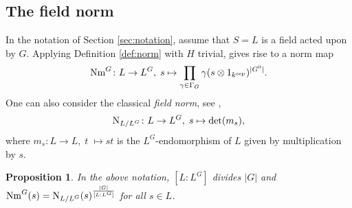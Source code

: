 \documentclass[12pt]{amsart}
\newtheorem{proposition}[theorem]{Proposition}
\theoremstyle{definition}
\begin{document}
\subsection{The field norm} \label{sec:fieldnorm}
In the notation of Section \ref{sec:notation}, assume that $S=L$ is a field acted upon by $G$. Applying Definition \ref{def:norm} with $H$ trivial, gives rise to a norm map 
\[
{\rm Nm}^G \colon L\rightarrow L^G,\;s\mapsto  \prod_{\gamma \in \Gamma_G}\gamma (s\otimes 1_{k^{\text{sep}}})^{|G^0|}.
\] 
One can also consider the classical {\em field norm}, see \cite[page 456]{MR3677125},
\begin{equation}\label{eq:normother2}
	{\rm N}_{L/L^G} \colon L\rightarrow L^G,\; s\mapsto {\rm det}(m_s),
\end{equation}
where $m_s \colon L\rightarrow L,\;t\;{\mapsto}st$ is the $L^G$-endomorphism of $L$ given by multiplication by $s$.

\begin{proposition}
	In the above notation, $[L{:}L^G]$ divides $|G|$ and ${\rm Nm}^G(s)={\rm N}_{L/L^G}(s)^{\frac{|G|}{[L{:}L^G]}}$ for all $s\in L$.
\end{proposition}
\end{document}
